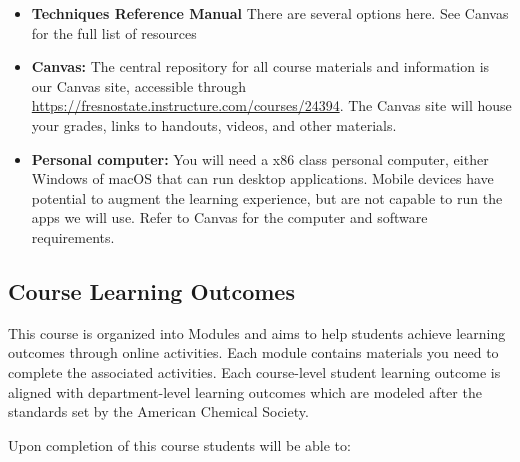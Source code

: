\begin{itemize}
\tightlist
\item
  \textbf{Techniques Reference Manual} There are several options here.
  See Canvas for the full list of resources 
\item
  \textbf{Canvas:} The central repository for all course materials and
  information is our Canvas site, accessible through
  \url{https://fresnostate.instructure.com/courses/24394}. The Canvas
  site will house your grades, links to handouts, videos, and other
  materials.
\item
  \textbf{Personal computer:} You will need a x86 class personal
  computer, either Windows of macOS that can run desktop applications.
  Mobile devices have potential to augment the learning experience, but
  are not capable to run the apps we will use. Refer to Canvas for the
  computer and software requirements.
\end{itemize}

\hypertarget{course-learning-outcomes}{%
\subsection{Course Learning Outcomes}\label{course-learning-outcomes}}

This course is organized into Modules and aims to help students achieve
learning outcomes through online activities. Each module contains
materials you need to complete the associated activities. Each
course-level student learning outcome is aligned with department-level
learning outcomes which are modeled after the standards set by the
American Chemical Society.

Upon completion of this course students will be able to:

